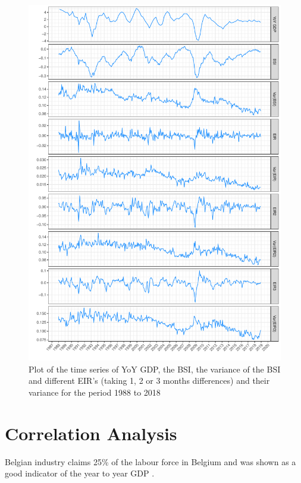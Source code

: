 \documentclass[12pt,a4paper,oneside]{book}
\begin{document}
\begin{figure}[!htbp]
    \centering
    \includegraphics[scale=0.75]{Graphs/variables.pdf}
    \caption{Plot of the time series of YoY GDP, the BSI, the variance of the BSI and different EIR's (taking 1, 2 or 3 months differences) and their variance
    for the period 1988 to 2018}
    \label{plot:variables}
\end{figure}



\section{Correlation Analysis}

Belgian industry claims 25\% of the labour force in Belgium and was shown as a good indicator of the year to year GDP
\cite{de_greef_national_2009}.
\end{document}
